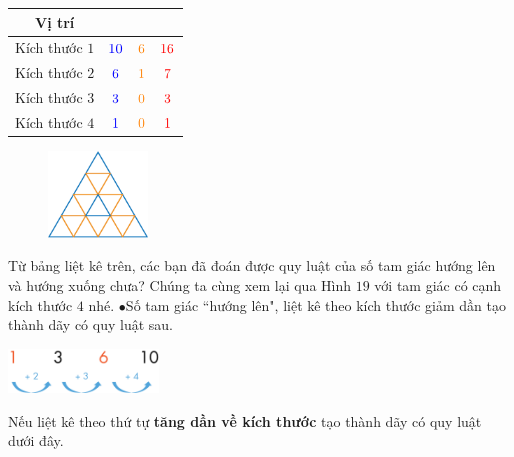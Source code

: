 \begin{multicols}{2}
	\begin{table}[H]
		\setlength{\tabcolsep}{2pt}
		\renewcommand{\arraystretch}{1.3}
		\begin{tabular}{|c|c|c|c|}
			\hline
			Vị trí & {\color{blue}{Lên}}  & {\color{orange}{Xuống}} & {\color{red}{Tổng}}\\
			\hline
			Kích thước $1$  & ${\color{blue}{10}}$ &${\color{orange}{6}}$ & ${\color{red}{16}}$ \\
			\hline
			Kích thước $2$  & ${\color{blue}{6}}$ & ${\color{orange}{1}}$ &  ${\color{red}{7}}$ \\
			\hline
			Kích thước $3$  & ${\color{blue}{3}}$ & ${\color{orange}{0}}$ & ${\color{red}{3}}$\\
			\hline
			Kích thước $4$  & ${\color{blue}{1}}$ & ${\color{orange}{0}}$ & ${\color{red}{1}}$\\
			\hline
		\end{tabular}
	\end{table}
	\begin{figure}[H]
		\vspace*{5pt}
		\centering
		\captionsetup{labelformat= empty, justification=centering}
		\includegraphics[width=0.235\textwidth]{Hinh25_1}
		\caption{}
		\vspace*{-10pt}
	\end{figure}
\end{multicols}
Từ bảng liệt kê trên, các bạn đã đoán được quy luật của số tam giác hướng lên và hướng xuống chưa? Chúng ta cùng xem lại qua  Hình $19$ với tam giác có cạnh kích thước $4$ nhé.
\vskip 0.1cm
$\bullet$Số tam giác ``hướng lên", liệt kê theo kích thước giảm dần tạo thành dãy có quy luật sau.
\begin{center}
	\includegraphics[width=0.3\textwidth]{QuyLuat}
\end{center}	
Nếu liệt kê theo thứ tự {\bf\color{toancuabi} tăng dần về kích thước} tạo thành dãy có quy luật dưới đây.
